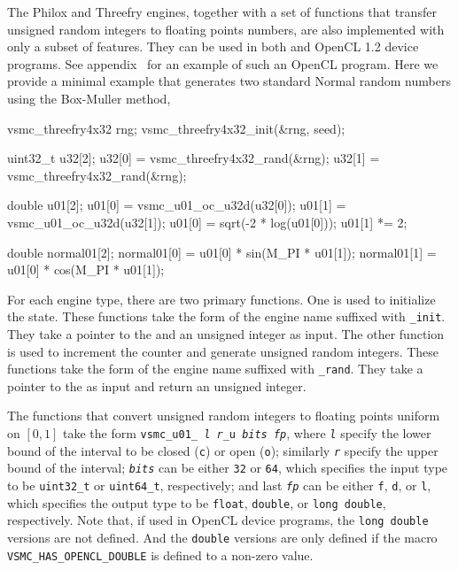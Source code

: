 The Philox and Threefry engines, together with a set of functions that transfer
unsigned random integers to floating points numbers, are also implemented with
only a subset of \cnn features. They can be used in both \cnn and OpenCL 1.2
device programs. See appendix~ for an example of such an OpenCL program. Here we provide a minimal
example that generates two standard Normal random numbers using the Box-Muller
method,
\begin{ccode}
    vsmc_threefry4x32 rng;
    vsmc_threefry4x32_init(&rng, seed);

    uint32_t u32[2];
    u32[0] = vsmc_threefry4x32_rand(&rng);
    u32[1] = vsmc_threefry4x32_rand(&rng);

    double u01[2];
    u01[0] = vsmc_u01_oc_u32d(u32[0]);
    u01[1] = vsmc_u01_oc_u32d(u32[1]);
    u01[0] = sqrt(-2 * log(u01[0]));
    u01[1] *= 2;

    double normal01[2];
    normal01[0] = u01[0] * sin(M_PI * u01[1]);
    normal01[1] = u01[0] * cos(M_PI * u01[1]);
\end{ccode}
For each engine type, there are two primary functions. One is used to
initialize the state. These functions take the form of the engine name suffixed
with \verb|_init|. They take a pointer to the \rng and an unsigned integer as
input. The other function is used to increment the counter and generate
unsigned random integers. These functions take the form of the engine name
suffixed with \verb|_rand|. They take a pointer to the \rng as input and return
an unsigned integer.

The functions that convert unsigned random integers to floating points uniform
on $[0, 1]$ take the form
\texttt{vsmc\_u01\_%
  \textcolor{MRed}{\textit{l}}%
  \textcolor{MRed}{\textit{r}}\_u%
  \textcolor{MRed}{\textit{bits}}%
  \textcolor{MRed}{\textit{fp}}},
where \texttt{\textcolor{MRed}{\textit{l}}} specify the lower bound of the
interval to be closed (\verb|c|) or open (\verb|o|); similarly
\texttt{\textcolor{MRed}{\textit{r}}} specify the upper bound of the interval;
\texttt{\textcolor{MRed}{\textit{bits}}} can be either \verb|32| or \verb|64|,
which specifies the input type to be \verb|uint32_t| or \verb|uint64_t|,
respectively; and last \texttt{\textcolor{MRed}{\textit{fp}}} can be either
\verb|f|, \verb|d|, or \verb|l|, which specifies the output type to be
\verb|float|, \verb|double|, or \verb|long double|, respectively. Note that, if
used in OpenCL device programs, the \verb|long double| versions are not
defined. And the \verb|double| versions are only defined if the macro
\verb|VSMC_HAS_OPENCL_DOUBLE| is defined to a non-zero value.
